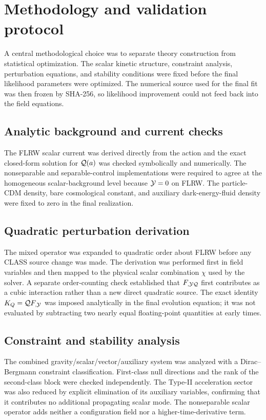 \section{Methodology and validation protocol}\label{sec:methods}
A central methodological choice was to separate theory construction from statistical optimization. The scalar kinetic structure, constraint analysis, perturbation equations, and stability conditions were fixed before the final likelihood parameters were optimized. The numerical source used for the final fit was then frozen by SHA-256, so likelihood improvement could not feed back into the field equations.

\subsection{Analytic background and current checks}
The FLRW scalar current was derived directly from the action and the exact closed-form solution for $\mathcal{Q}(a)$ was checked symbolically and numerically. The nonseparable and separable-control implementations were required to agree at the homogeneous scalar-background level because $\mathcal{Y}=0$ on FLRW. The particle-CDM density, bare cosmological constant, and auxiliary dark-energy-fluid density were fixed to zero in the final realization.

\subsection{Quadratic perturbation derivation}
The mixed operator was expanded to quadratic order about FLRW before any CLASS source change was made. The derivation was performed first in field variables and then mapped to the physical scalar combination $\chi$ used by the solver. A separate order-counting check established that $F_{,\mathcal{Y}\mathcal{Q}}$ first contributes as a cubic interaction rather than a new direct quadratic source. The exact identity $K_Q=\mathcal{Q} F_{,\mathcal{Y}}$ was imposed analytically in the final evolution equation; it was not evaluated by subtracting two nearly equal floating-point quantities at early times.

\subsection{Constraint and stability analysis}
The combined gravity/scalar/vector/auxiliary system was analyzed with a Dirac--Bergmann constraint classification. First-class null directions and the rank of the second-class block were checked independently. The Type-II acceleration sector was also reduced by explicit elimination of its auxiliary variables, confirming that it contributes no additional propagating scalar mode. The nonseparable scalar operator adds neither a configuration field nor a higher-time-derivative term.

